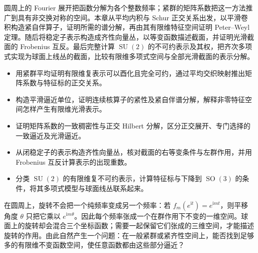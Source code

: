 
% 
% 


\begin{chapterabstract}
	圆周上的 Fourier 展开把函数分解为各个整数频率；紧群的矩阵系数把这一方法推广到具有非交换对称的空间。本章从平均内积与 Schur 正交关系出发，以平滑卷积构造紧自伴算子，证明所需的谱分解，再由其有限维特征空间证明 Peter--Weyl 定理。随后将稳定子表示构造成齐性向量丛，以等变函数描述截面，并证明光滑截面的 Frobenius 互反。最后完整计算 \(\operatorname{SU}(2)\) 的不可约表示及其权，把齐次多项式实现为球面上线丛的截面，比较有限维多项式空间与全部光滑截面的表示分解。
\end{chapterabstract}

\begin{learninggoals}
	\begin{itemize}
		\item 用紧群平均证明有限维复表示可以酉化且完全可约，通过平均交织映射推出矩阵系数与特征标的正交关系。
		\item 构造平滑逼近单位，证明连续核算子的紧性及紧自伴谱分解，解释非零特征空间怎样产生有限维光滑表示。
		\item 证明矩阵系数的一致稠密性与正交 Hilbert 分解，区分正交展开、专门选择的一致逼近及光滑逼近。
		\item 从闭稳定子的表示构造齐性向量丛，核对截面的右等变条件与左群作用，并用 Frobenius 互反计算表示的出现重数。
		\item 分类 \(\operatorname{SU}(2)\) 的有限维复不可约表示，计算特征标与下降到 \(\operatorname{SO}(3)\) 的条件，将其多项式模型与球面线丛联系起来。
	\end{itemize}
\end{learninggoals}

在圆周上，旋转不会把一个纯频率变成另一个频率：若 \(f_m(e^{\mathrm{i}t})=e^{\mathrm{i}mt}\)，则平移角度 \(\theta\) 只把它乘以 \(e^{\mathrm{i}m\theta}\)。因此每个频率张成一个在群作用下不变的一维空间。球面上的旋转却会混合三个坐标函数；需要一起保留它们张成的三维空间，才能描述旋转的作用。由此自然产生一个问题：在一般紧群或紧齐性空间上，能否找到足够多的有限维不变函数空间，使任意函数都由这些部分逼近？

